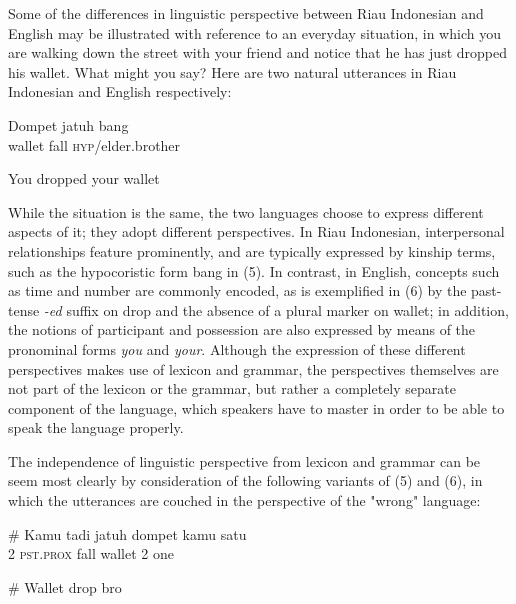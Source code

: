 \documentclass[output=paper,colorlinks,citecolor=brown
]{langscibook}
\begin{document}
Some of the differences in linguistic perspective between Riau Indonesian and English may be illustrated with reference to an everyday situation, in which you are walking down the street with your friend and notice that he has just dropped his wallet.  What might you say?  Here are two natural utterances in Riau Indonesian and English respectively:

\ea
\gll Dompet	jatuh	bang \\
    wallet	fall	\textsc{hyp}/elder.brother \\
\z

\ea
You dropped your wallet \\
\z

While the situation is the same, the two languages choose to express different aspects of it; they adopt different perspectives. In Riau Indonesian, interpersonal relationships feature prominently, and are typically expressed by kinship terms, such as the hypocoristic form bang in (5).  In contrast, in English, concepts such as time and number are commonly encoded, as is exemplified in (6) by the past-tense \emph{-ed} suffix on drop and the absence of a plural marker on wallet; in addition, the notions of participant and possession are also expressed by means of the pronominal forms \emph{you} and \emph{your}. Although the expression of these different perspectives makes use of lexicon and grammar, the perspectives themselves are not part of the lexicon or the grammar, but rather a completely separate component of the language, which speakers have to master in order to be able to speak the language properly.  

The independence of linguistic perspective from lexicon and grammar can be seem most clearly by consideration of the following variants of (5) and (6), in which the utterances are couched in the perspective of the "wrong" language:

\ea
\gll \# Kamu	tadi	jatuh	dompet	kamu	satu \\
    { } 2	\textsc{pst.prox}	fall	wallet	2	one \\
\z

\ea
\# Wallet drop bro \\
\z
\end{document}
